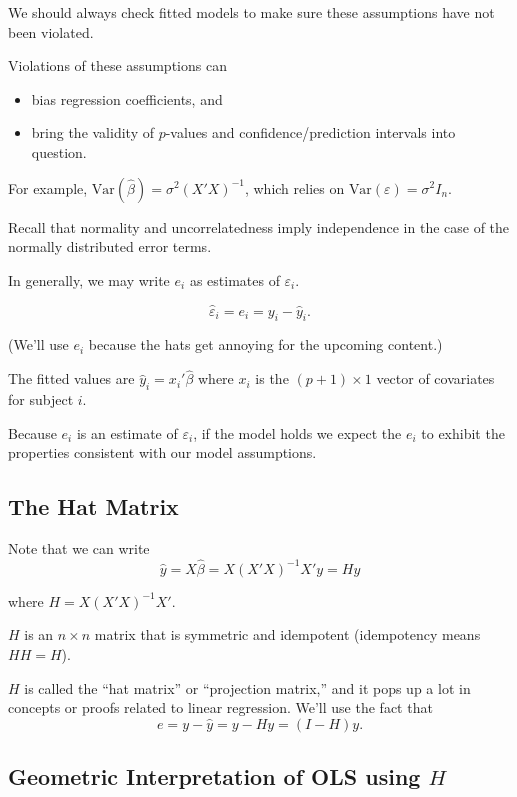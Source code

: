 \documentclass[
  letterpaper,
  DIV=11,
  numbers=noendperiod]{scrreport}
\providecommand{\tightlist}{%
  \setlength{\itemsep}{0pt}\setlength{\parskip}{0pt}}\usepackage{longtable,booktabs,array}
\begin{document}
We should always check fitted models to make sure these assumptions have
not been violated.

Violations of these assumptions can

\begin{itemize}
\tightlist
\item
  bias regression coefficients, and
\item
  bring the validity of \(p\)-values and confidence/prediction intervals
  into question.
\end{itemize}

For example, \(\text{Var}(\hat \beta) = \sigma^2 (X'X)^{-1}\), which
relies on \(\text{Var}(\varepsilon) = \sigma^2 I_n\).

Recall that normality and uncorrelatedness imply independence in the
case of the normally distributed error terms.

In generally, we may write \(e_i\) as estimates of \(\varepsilon_i\).

\[\hat \varepsilon_i = e_i = y_i - \hat y_i.\]

(We'll use \(e_i\) because the hats get annoying for the upcoming
content.)

The fitted values are \(\hat y_i = x_i'\hat\beta\) where \(x_i\) is the
\((p+1)\times 1\) vector of covariates for subject \(i\).

Because \(e_i\) is an estimate of \(\varepsilon_i\), if the model holds
we expect the \(e_i\) to exhibit the properties consistent with our
model assumptions.

\hypertarget{the-hat-matrix}{%
\subsection{The Hat Matrix}\label{the-hat-matrix}}

Note that we can write \[\hat y = X \hat \beta = X(X'X)^{-1}X'y = Hy\]

where \(H = X(X'X)^{-1}X'\).

\(H\) is an \(n \times n\) matrix that is symmetric and idempotent
(idempotency means \(HH = H\)).

\(H\) is called the ``hat matrix'' or ``projection matrix,'' and it pops
up a lot in concepts or proofs related to linear regression. We'll use
the fact that \[e = y - \hat y = y - Hy = (I - H)y.\]

\hypertarget{geometric-interpretation-of-ols-using-h}{%
\subsection{\texorpdfstring{Geometric Interpretation of OLS using
\(H\)}{Geometric Interpretation of OLS using H}}\label{geometric-interpretation-of-ols-using-h}}
\end{document}
